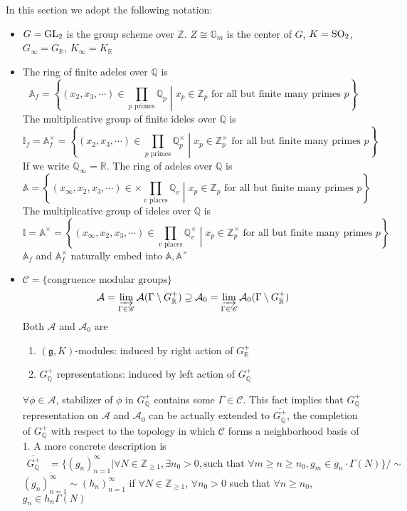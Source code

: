 \documentclass[main]{subfiles}
\begin{document}
In this section we adopt the following notation:
\begin{itemize}
\item $G=\operatorname{GL}_2$ is the group scheme over $\mathbb Z$. $Z\cong\mathbb G_m$ is the center of $G$, $K=\operatorname{SO}_2$, $G_\infty=G_{\mathbb R}$, $K_\infty=K_{\mathbb R}$
\item The ring of finite adeles over $\mathbb Q$ is
\[
\mathbb A_f=\left\{(x_2,x_3,\cdots)\in\prod_{p\text{ primes}}\mathbb Q_p\middle|x_p\in\mathbb Z_p\text{ for all but finite many primes }p\right\}
\]
The multiplicative group of finite ideles over $\mathbb Q$ is
\[
\mathbb I_f=\mathbb A^\times_f=\left\{(x_2,x_3,\cdots)\in\prod_{p\text{ primes}}\mathbb Q^\times_p\middle|x_p\in\mathbb Z^\times_p\text{ for all but finite many primes }p\right\}
\]
If we write $\mathbb Q_\infty=\mathbb R$. The ring of adeles over $\mathbb Q$ is
\[
\mathbb A=\left\{(x_\infty,x_2,x_3,\cdots)\in\times\prod_{v\text{ places}}\mathbb Q_v\middle|x_p\in\mathbb Z_p\text{ for all but finite many primes }p\right\}
\]
The multiplicative group of ideles over $\mathbb Q$ is
\[
\mathbb I=\mathbb A^\times=\left\{(x_\infty,x_2,x_3,\cdots)\in\prod_{v\text{ places}}\mathbb Q^\times_v\middle|x_p\in\mathbb Z^\times_p\text{ for all but finite many primes }p\right\}
\]
$\mathbb A_f$ and $\mathbb A^\times_f$ naturally embed into $\mathbb A,\mathbb A^\times$
\item $\mathscr C=\{\text{congruence modular groups}\}$
\[\mathcal A=\varinjlim_{\Gamma\in\mathscr C}\mathcal A(\Gamma\setminus G^+_{\mathbb R})\supseteq\mathcal A_0=\varinjlim_{\Gamma\in\mathscr C}\mathcal A_0(\Gamma\setminus G^+_{\mathbb R})\]
Both $\mathcal A$ and $\mathcal A_0$ are
\begin{enumerate}
\item $(\mathfrak g,K)$-modules: induced by right action of $G^+_{\mathbb R}$
\item $G_{\mathbb Q}^+$ representations: induced by left action of $G_{\mathbb Q}^+$
\end{enumerate}
$\forall\phi\in\mathcal A$, stabilizer of $\phi$ in $G^+_{\mathbb Q}$ contains some $\Gamma\in\mathscr C$. This fact implies that $G_{\mathbb Q}^+$ representation on $\mathcal A$ and $\mathcal A_0$ can be actually extended to $\overline{G^+_{\mathbb Q}}$, the completion of $G^+_{\mathbb Q}$ with respect to the topology in which $\mathscr C$ forms a neighborhood basis of 1. A more concrete description is
\begin{align*}
\overline{G^+_{\mathbb Q}}&=\{(g_n)_{n=1}^\infty|\forall N\in\mathbb Z_{\geq1},\exists n_0>0,\text{such that }\forall m\geq n\geq n_0,g_m\in g_n\cdot\Gamma(N)\}/\sim
\end{align*}
$(g_n)_{n=1}^\infty\sim(h_n)_{n=1}^\infty$ if $\forall N\in\mathbb Z_{\geq1}$, $\forall n_0>0$ such that $\forall n\geq n_0$, $g_n\in h_n\Gamma(N)$
\end{itemize}
\end{document}
